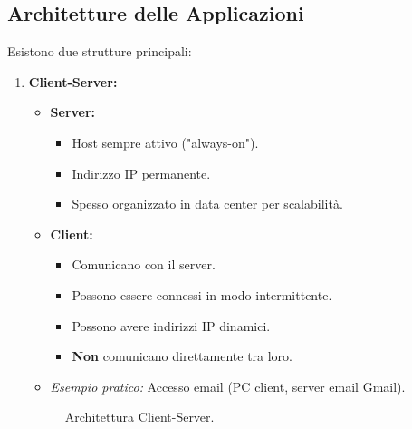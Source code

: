 \subsection{Architetture delle Applicazioni}
Esistono due strutture principali:

\begin{enumerate}
    \item \textbf{Client-Server:}
    \begin{itemize}
        \item \textbf{Server:}
        \begin{itemize}
            \item Host sempre attivo ("always-on").
            \item Indirizzo IP permanente.
            \item Spesso organizzato in data center per scalabilità.
        \end{itemize}
        \item \textbf{Client:}
        \begin{itemize}
            \item Comunicano con il server.
            \item Possono essere connessi in modo intermittente.
            \item Possono avere indirizzi IP dinamici.
            \item \textbf{Non} comunicano direttamente tra loro.
        \end{itemize}
        \item \textit{Esempio pratico:} Accesso email (PC client, server email Gmail).
    \end{itemize}

\begin{figure}[H]
    \centering
    \caption{Architettura Client-Server.}
\end{figure}


\end{enumerate}
